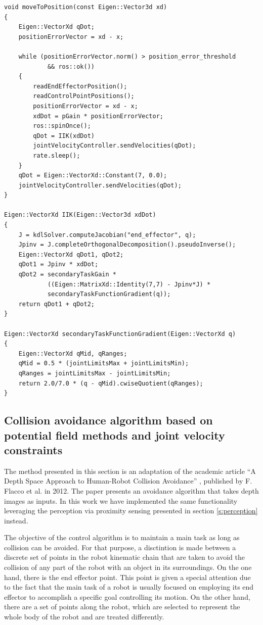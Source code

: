 \begin{lstlisting}[caption={CartesianPositionController.cpp},captionpos=b]
void moveToPosition(const Eigen::Vector3d xd)
{
    Eigen::VectorXd qDot;
    positionErrorVector = xd - x;

    while (positionErrorVector.norm() > position_error_threshold
            && ros::ok())
    {
        readEndEffectorPosition();
        readControlPointPositions();
        positionErrorVector = xd - x;
        xdDot = pGain * positionErrorVector;
        ros::spinOnce();
        qDot = IIK(xdDot)
        jointVelocityController.sendVelocities(qDot);
        rate.sleep();
    }
    qDot = Eigen::VectorXd::Constant(7, 0.0);
    jointVelocityController.sendVelocities(qDot);
}

Eigen::VectorXd IIK(Eigen::Vector3d xdDot)
{
    J = kdlSolver.computeJacobian("end_effector", q);
    Jpinv = J.completeOrthogonalDecomposition().pseudoInverse();
    Eigen::VectorXd qDot1, qDot2;
    qDot1 = Jpinv * xdDot;
    qDot2 = secondaryTaskGain *
            ((Eigen::MatrixXd::Identity(7,7) - Jpinv*J) *
            secondaryTaskFunctionGradient(q));
    return qDot1 + qDot2;
}

Eigen::VectorXd secondaryTaskFunctionGradient(Eigen::VectorXd q)
{
    Eigen::VectorXd qMid, qRanges;
    qMid = 0.5 * (jointLimitsMax + jointLimitsMin);
    qRanges = jointLimitsMax - jointLimitsMin;
    return 2.0/7.0 * (q - qMid).cwiseQuotient(qRanges);
}
\end{lstlisting}

\subsection{Collision avoidance algorithm based on potential field methods and joint velocity constraints}
\label{ss:flacco}

The method presented in this section is an adaptation of the academic article ``A Depth Space Approach to Human-Robot Collision Avoidance'' \cite{flacco2012depth}, published by F. Flacco et al. in 2012. The paper presents an avoidance algorithm that takes depth images as inputs. In this work we have implemented the same functionality leveraging the perception via proximity sensing presented in section \ref{s:perception} instead.

The objective of the control algorithm is to maintain a main task as long as collision can be avoided. For that purpose, a disctintion is made between a discrete set of points in the robot kinematic chain that are taken to avoid the collision of any part of the robot with an object in its surroundings. On the one hand, there is the end effector point. This point is given a special attention due to the fact that the main task of a robot is usually focused on employing its end effector to accomplish a specific goal controlling its motion. On the other hand, there are a set of points along the robot, which are selected to represent the whole body of the robot and are treated differently.

